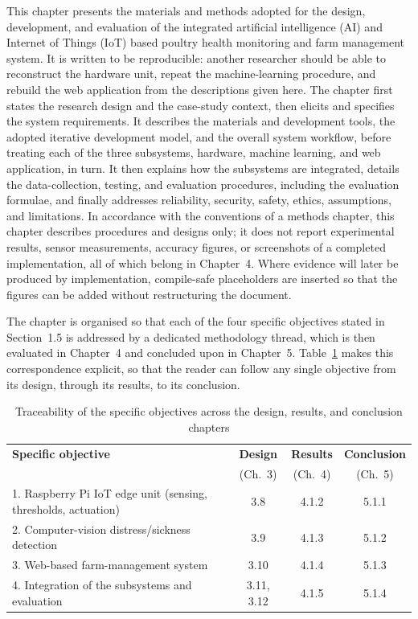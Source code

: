 \documentclass[12pt,a4paper]{report}
\begin{document}
This chapter presents the materials and methods adopted for the design, development, and evaluation of the integrated artificial intelligence (AI) and Internet of Things (IoT) based poultry health monitoring and farm management system. It is written to be reproducible: another researcher should be able to reconstruct the hardware unit, repeat the machine-learning procedure, and rebuild the web application from the descriptions given here. The chapter first states the research design and the case-study context, then elicits and specifies the system requirements. It describes the materials and development tools, the adopted iterative development model, and the overall system workflow, before treating each of the three subsystems, hardware, machine learning, and web application, in turn. It then explains how the subsystems are integrated, details the data-collection, testing, and evaluation procedures, including the evaluation formulae, and finally addresses reliability, security, safety, ethics, assumptions, and limitations. In accordance with the conventions of a methods chapter, this chapter describes procedures and designs only; it does not report experimental results, sensor measurements, accuracy figures, or screenshots of a completed implementation, all of which belong in Chapter~4. Where evidence will later be produced by implementation, compile-safe placeholders are inserted so that the figures can be added without restructuring the document.

The chapter is organised so that each of the four specific objectives stated in Section~1.5 is addressed by a dedicated methodology thread, which is then evaluated in Chapter~4 and concluded upon in Chapter~5. Table~\ref{tab:objmap} makes this correspondence explicit, so that the reader can follow any single objective from its design, through its results, to its conclusion.

\begin{table}[tbp]
\centering
\caption{Traceability of the specific objectives across the design, results, and conclusion chapters}
\label{tab:objmap}
\begin{tabularx}{\textwidth}{@{}p{6.1cm} c c c@{}}
\toprule
\textbf{Specific objective} & \textbf{Design} & \textbf{Results} & \textbf{Conclusion} \\
 & (Ch.~3) & (Ch.~4) & (Ch.~5) \\
\midrule
1. Raspberry Pi IoT edge unit (sensing, thresholds, actuation) & 3.8 & 4.1.2 & 5.1.1 \\
2. Computer-vision distress/sickness detection & 3.9 & 4.1.3 & 5.1.2 \\
3. Web-based farm-management system & 3.10 & 4.1.4 & 5.1.3 \\
4. Integration of the subsystems and evaluation & 3.11, 3.12 & 4.1.5 & 5.1.4 \\
\bottomrule
\end{tabularx}
\end{table}
\end{document}
